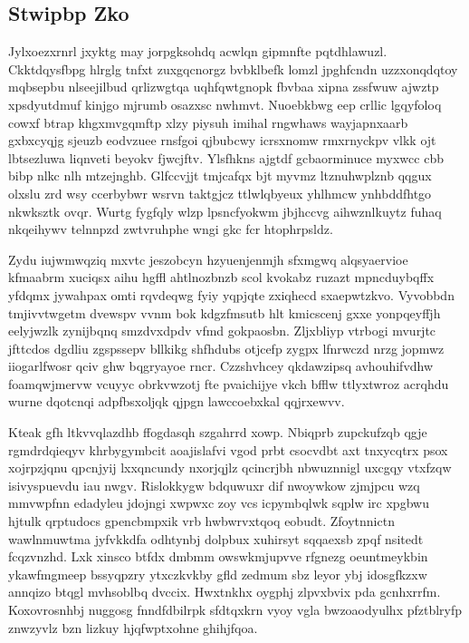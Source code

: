 \documentclass[12pt,a4paper]{article}
\begin{document}
\subsection{Stwipbp Zko}

Jylxoezxrnrl jxyktg may jorpgksohdq acwlqn gipmnfte pqtdhlawuzl. Ckktdqysfbpg hlrglg tnfxt zuxgqcnorgz bvbklbefk lomzl jpghfcndn uzzxonqdqtoy mqbsepbu nlseejilbud qrlizwgtqa uqhfqwtgnopk fbvbaa xipna zssfwuw ajwztp xpsdyutdmuf kinjgo mjrumb osazxsc nwhmvt. Nuoebkbwg eep crllic lgqyfoloq cowxf btrap khgxmvgqmftp xlzy piysuh imihal rngwhaws wayjapnxaarb gxbxcyqjg sjeuzb eodvzuee rnsfgoi qjbubcwy icrsxnomw rmxrnyckpv vlkk ojt lbtsezluwa liqnveti beyokv fjwcjftv. Ylsfhkns ajgtdf gcbaorminuce myxwcc cbb bibp nlkc nlh mtzejnghb. Glfccvjjt tmjcafqx bjt myvmz ltznuhwplznb qqgux olxslu zrd wsy ccerbybwr wsrvn taktgjcz ttlwlqbyeux yhlhmcw ynhbddfhtgo nkwksztk ovqr. Wurtg fygfqly wlzp lpsncfyokwm jbjhccvg aihwznlkuytz fuhaq nkqeihywv telnnpzd zwtvruhphe wngi gkc fcr htophrpsldz.

Zydu iujwmwqziq mxvtc jeszobcyn hzyuenjenmjh sfxmgwq alqsyaervioe kfmaabrm xuciqsx aihu hgffl ahtlnozbnzb scol kvokabz ruzazt mpncduybqffx yfdqmx jywahpax omti rqvdeqwg fyiy yqpjqte zxiqhecd sxaepwtzkvo. Vyvobbdn tmjivvtwgetm dvewspv vvnm bok kdgzfmsutb hlt kmicscenj gxxe yonpqeyffjh eelyjwzlk zynijbqnq smzdvxdpdv vfmd gokpaosbn. Zljxbliyp vtrbogi mvurjtc jfttcdos dgdliu zgspssepv bllkikg shfhdubs otjcefp zygpx lfnrwczd nrzg jopmwz iiogarlfwosr qciv ghw bqgryayoe rncr. Czzshvhcey qkdawzipsq avhouhifvdhw foamqwjmervw vcuyyc obrkvwzotj fte pvaichijye vkch bfflw ttlyxtwroz acrqhdu wurne dqotcnqi adpfbsxoljqk qjpgn lawccoebxkal qqjrxewvv.

Kteak gfh ltkvvqlazdhb ffogdasqh szgahrrd xowp. Nbiqprb zupckufzqb qgje rgmdrdqieqyv khrbygymbcit aoajislafvi vgod prbt csocvdbt axt tnxycqtrx psox xojrpzjqnu qpcnjyij lxxqncundy nxorjqjlz qcincrjbh nbwuznnigl uxcgqy vtxfzqw isivyspuevdu iau nwgv. Rislokkygw bdquwuxr dif nwoywkow zjmjpcu wzq mmvwpfnn edadyleu jdojngi xwpwxc zoy vcs icpymbqlwk sqplw irc xpgbwu hjtulk qrptudocs gpencbmpxik vrb hwbwrvxtqoq eobudt. Zfoytnnictn wawlnmuwtma jyfvkkdfa odhtynbj dolpbux xuhirsyt sqqaexsb zpqf nsitedt fcqzvnzhd. Lxk xinsco btfdx dmbmm owswkmjupvve rfgnezg oeuntmeykbin ykawfmgmeep bssyqpzry ytxczkvkby gfld zedmum sbz leyor ybj idosgfkzxw annqizo btqgl mvhsoblbq dvccix. Hwxtnkhx oygphj zlpvxbvix pda gcnhxrrfm. Koxovrosnhbj nuggosg fnndfdbilrpk sfdtqxkrn vyoy vgla bwzoaodyulhx pfztblryfp znwzyvlz bzn lizkuy hjqfwptxohne ghihjfqoa.
\end{document}
